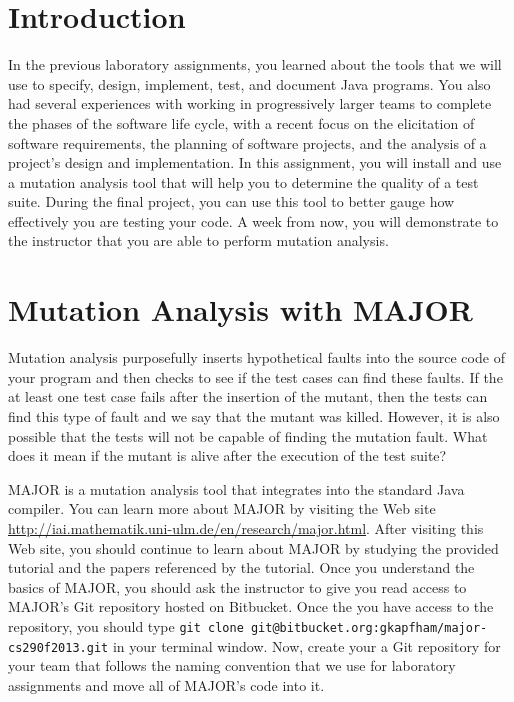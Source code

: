 

\usepackage[compact]{titlesec}



\section*{Introduction}

In the previous laboratory assignments, you learned about the tools that we will use to specify, design, implement,
test, and document Java programs.  You also had several experiences with working in progressively larger teams to
complete the phases of the software life cycle, with a recent focus on the elicitation of software requirements, the
planning of software projects, and the analysis of a project's design and implementation.  In this assignment, you will
install and use a mutation analysis tool that will help you to determine the quality of a test suite.  During the final
project, you can use this tool to better gauge how effectively you are testing your code. A week from now, you will
demonstrate to the instructor that you are able to perform mutation analysis.

\section*{Mutation Analysis with MAJOR}

Mutation analysis purposefully inserts hypothetical faults into the source code of your program and then checks to see
if the test cases can find these faults.  If the at least one test case fails after the insertion of the mutant, then
the tests can find this type of fault and we say that the mutant was killed.  However, it is also possible that the
tests will not be capable of finding the mutation fault. What does it mean if the mutant is alive after the execution of
the test suite?

MAJOR is a mutation analysis tool that integrates into the standard Java compiler. You can learn more about MAJOR by
visiting the Web site \url{http://iai.mathematik.uni-ulm.de/en/research/major.html}.  After visiting this Web site, you
should continue to learn about MAJOR by studying the provided tutorial and the papers referenced by the tutorial.  Once
you understand the basics of MAJOR, you should ask the instructor to give you read access to MAJOR's Git repository
hosted on Bitbucket. Once the you have access to the repository, you should type {\tt git clone
git@bitbucket.org:gkapfham/major-cs290f2013.git} in your terminal window.  Now, create your a Git repository for your
team that follows the naming convention that we use for laboratory assignments and move all of MAJOR's code into it. 

